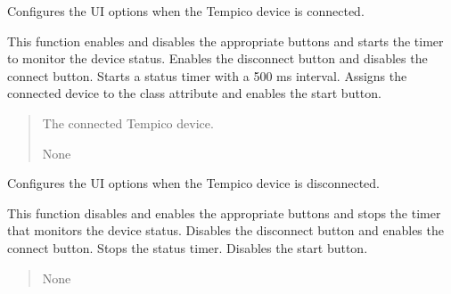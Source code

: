 \documentclass[letterpaper,10pt,english]{sphinxmanual}
\begin{document}
\begin{fulllineitems}
\begin{fulllineitems}
\label{\detokenize{FLIMGraphics:FLIMGraphics.FLIMGraphic.connectedDevice}}
\pysigstartsignatures
{}
\pysigstopsignatures
\sphinxAtStartPar
Configures the UI options when the Tempico device is connected.

\sphinxAtStartPar
This function enables and disables the appropriate buttons and starts the timer to monitor the device status.
\sphinxhyphen{} Enables the disconnect button and disables the connect button.
\sphinxhyphen{} Starts a status timer with a 500 ms interval.
\sphinxhyphen{} Assigns the connected device to the class attribute and enables the start button.
\begin{quote}\begin{description}
\sphinxAtStartPar
{} \textendash{} The connected Tempico device.

\sphinxAtStartPar
None

\end{description}\end{quote}

\end{fulllineitems}


\begin{fulllineitems}
\label{\detokenize{FLIMGraphics:FLIMGraphics.FLIMGraphic.disconnectedDevice}}
\pysigstartsignatures
{}
\pysigstopsignatures
\sphinxAtStartPar
Configures the UI options when the Tempico device is disconnected.

\sphinxAtStartPar
This function disables and enables the appropriate buttons and stops the timer that monitors the device status.
\sphinxhyphen{} Disables the disconnect button and enables the connect button.
\sphinxhyphen{} Stops the status timer.
\sphinxhyphen{} Disables the start button.
\begin{quote}\begin{description}
\sphinxAtStartPar
None

\end{description}\end{quote}


\end{fulllineitems}
\end{fulllineitems}
\end{document}
